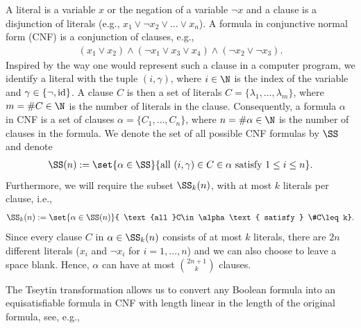 \documentclass{amsart}[11pt]
\numberwithin{equation}{section}
\newcommand{\identity}{\rm id}
\numberwithin{theorem}{section}
\begin{document}
A literal is a variable $x$ or the negation of a variable $\lnot x$ and a clause is a disjunction of literals (e.g., $x_1\lor \lnot x_2\lor \ldots \lor x_n$). A formula in conjunctive normal form (CNF) is a conjunction of clauses, e.g.,
\begin{align*}
    (x_1 \lor x_2) \land (\lnot x_1 \lor x_3 \lor x_4) \land (\lnot x_2 \lor \lnot x_3).
\end{align*}
Inspired by the way one would represent such a clause in a computer program, we identify a literal with the tuple $(i,\gamma)$, where $i \in \N$ is the index of the variable and $\gamma \in \{\neg, \identity\}$. A clause $C$ is then a set of literals $C = \{\lambda_1, \ldots, \lambda_m\}$, where $m =\# C \in \N$ is the number of literals in the clause. Consequently, a formula $\alpha$ in CNF is a set of clauses $\alpha = \{C_1, \ldots, C_n\}$, where $n = \#\alpha \in \N$ is the number of clauses in the formula.
We denote the set of all possible CNF formulas by $\SS$ and denote
\begin{align*}
    \SS(n) := \set{\alpha \in \SS }{ \text{all }(i,\gamma)\in C\in \alpha\text{ satisfy } 1\leq i\leq n }.
\end{align*}
Furthermore, we will require the subset $\SS_k(n)$, with at most $k$ literals per clause, i.e.,
\begin{align*}
\SS_k(n) := \set{\alpha \in \SS(n)}{ \text{all }C\in \alpha\text{ satisfy } \#C\leq k}.
\end{align*}
Since every clause $C$ in $\alpha \in \SS_k(n)$ consists of at most $k$ literals, there are $2n$ different literals ($x_i$ and $\lnot x_i$ for $i=1,\ldots,n$) and we can also choose to leave a space blank. Hence, $\alpha$ can have at most $\binom{2n+1}{k}$ clauses.


\begin{remark}
    The Tseytin transformation allows us to convert any Boolean formula into an equisatisfiable formula in CNF with length linear in the length of the original formula, see, e.g.,~\cite{Tseitin1983}
\end{remark}
\end{document}
